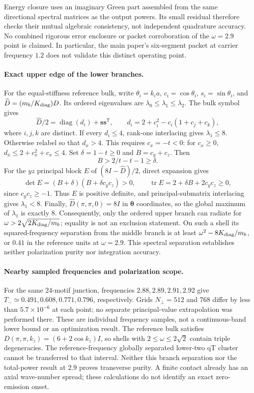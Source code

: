 \documentclass[10pt,aps,onecolumn,notitlepage,nofootinbib]{revtex4-2}
\begin{document}
Energy closure uses an imaginary Green part assembled from the same directional spectral matrices as the output powers. Its small residual therefore checks their mutual algebraic consistency, not independent quadrature accuracy. No combined rigorous error enclosure or packet corroboration of the $\omega=2.9$ point is claimed. In particular, the main paper's six-segment packet at carrier frequency $1.2$ does not validate this distinct operating point.

\paragraph*{Exact upper edge of the lower branches.}
For the equal-stiffness reference bulk, write $\theta_i=k_i a$, $c_i=\cos\theta_i$, $s_i=\sin\theta_i$, and $\widehat D=(m_b/K_{\rm diag})D$. Its ordered eigenvalues are $\lambda_0\leq\lambda_1\leq\lambda_2$. The bulk symbol gives
\[
 \widehat D/2=\operatorname{diag}(d_i)+\bm s\bm s^{\mathsf T},\qquad
 d_i=2+c_i^2-c_i(1+c_j+c_k),
\]
where $i,j,k$ are distinct. If every $d_i\leq4$, rank-one interlacing gives $\lambda_1\leq8$. Otherwise relabel so that $d_x>4$. This requires $c_x=-t<0$: for $c_x\geq0$, $d_x\leq2+c_x^2+c_x\leq4$. Set $\delta=1-t\geq0$ and $B=c_y+c_z$. Then
\[
 B>2/t-t-1\geq\delta.
\]
For the $yz$ principal block $E$ of $(8I-\widehat D)/2$, direct expansion gives
\[
 \det E=(B+\delta)(B+\delta c_yc_z)>0,\qquad
 \operatorname{tr}E=2+\delta B+2c_yc_z\geq0,
\]
since $c_yc_z\geq-1$. Thus $E$ is positive definite, and principal-submatrix interlacing gives $\lambda_1<8$. Finally, $\widehat D(\pi,\pi,0)=8I$ in $\bm\theta$ coordinates, so the global maximum of $\lambda_1$ is exactly $8$. Consequently, only the ordered upper branch can radiate for $\omega>2\sqrt{2K_{\rm diag}/m_b}$; equality is not an exclusion statement. On such a shell its squared-frequency separation from the middle branch is at least $\omega^2-8K_{\rm diag}/m_b$, or $0.41$ in the reference units at $\omega=2.9$. This spectral separation establishes neither polarization purity nor integration accuracy.

\paragraph*{Nearby sampled frequencies and polarization scope.}
For the same 24-motif junction, frequencies $2.88,2.89,2.91,2.92$ give $T_-\simeq0.491,0.608,0.771,0.796$, respectively. Grids $N_\perp=512$ and $768$ differ by less than $5.7\times10^{-6}$ at each point; no separate principal-value extrapolation was performed there. These are individual frequency samples, not a continuous-band lower bound or an optimization result. The reference bulk satisfies $D(\pi,\pi,k_z)=(6+2\cos k_z)I$, so shells with $2\leq\omega\leq2\sqrt2$ contain triple degeneracies. The reference-frequency globally separated lower-two qT cluster cannot be transferred to that interval. Neither this branch separation nor the total-power result at $2.9$ proves transverse purity. A finite contact already has an axial wave-number spread; these calculations do not identify an exact zero-emission onset.
\end{document}
